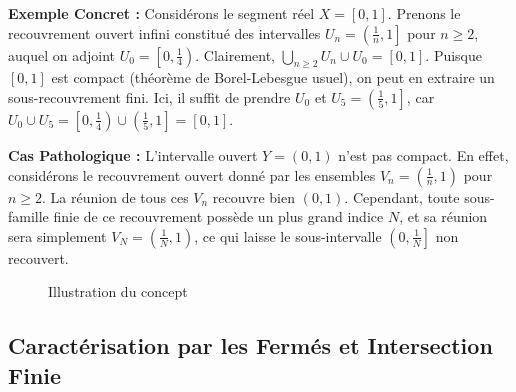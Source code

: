 \documentclass[11pt,a4paper]{article}
\begin{document}
\textbf{Exemple Concret :}
Considérons le segment réel $X = [0, 1]$. Prenons le recouvrement ouvert infini constitué des intervalles $U_n = \left( \frac{1}{n}, 1 \right]$ pour $n \ge 2$, auquel on adjoint $U_0 = \left[ 0, \frac{1}{4} \right)$.
Clairement, $\bigcup_{n \ge 2} U_n \cup U_0 = [0, 1]$. Puisque $[0, 1]$ est compact (théorème de Borel-Lebesgue usuel), on peut en extraire un sous-recouvrement fini. Ici, il suffit de prendre $U_0$ et $U_5 = \left( \frac{1}{5}, 1 \right]$, car $U_0 \cup U_5 = \left[ 0, \frac{1}{4} \right) \cup \left( \frac{1}{5}, 1 \right] = [0, 1]$.

\textbf{Cas Pathologique :}
L'intervalle ouvert $Y = (0, 1)$ n'est pas compact. En effet, considérons le recouvrement ouvert donné par les ensembles $V_n = \left( \frac{1}{n}, 1 \right)$ pour $n \ge 2$. La réunion de tous ces $V_n$ recouvre bien $(0, 1)$. Cependant, toute sous-famille finie de ce recouvrement possède un plus grand indice $N$, et sa réunion sera simplement $V_N = \left( \frac{1}{N}, 1 \right)$, ce qui laisse le sous-intervalle $\left( 0, \frac{1}{N} \right]$ non recouvert.

\begin{figure}[h!]
\centering
{}
\caption{Illustration du concept}
\end{figure}

\subsection{Caractérisation par les Fermés et Intersection Finie}
\end{document}
